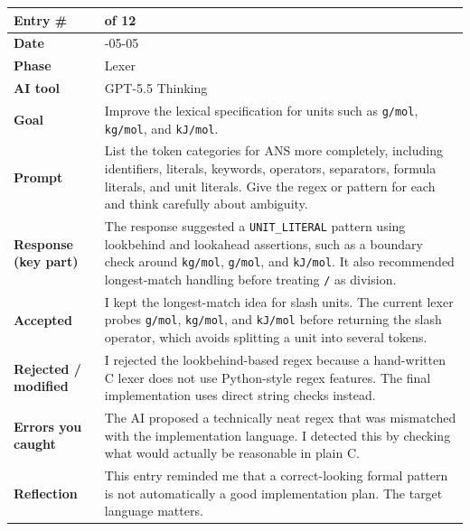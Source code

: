 \documentclass[11pt,a4paper]{article}
\newcommand{\code}[1]{\texttt{#1}}
\newcommand{\entrygap}{\vspace{8pt}}
\newenvironment{journalentry}{%
  \begin{center}\small\renewcommand{\arraystretch}{1.22}%
  \begin{tabular}{|>{\columncolor{anscodebg}\bfseries}p{3.0cm}|>{\RaggedRight\arraybackslash}p{12.25cm}|}%
  \hline
}{%
  \end{tabular}\end{center}\entrygap
}
\begin{document}
\begin{journalentry}
Entry \# & 4 of 12 \\ \hline
Date & 2026-05-05 \\ \hline
Phase & Lexer \\ \hline
AI tool & GPT-5.5 Thinking \\ \hline
Goal & Improve the lexical specification for units such as \code{g/mol}, \code{kg/mol}, and \code{kJ/mol}. \\ \hline
Prompt & List the token categories for ANS more completely, including identifiers, literals, keywords, operators, separators, formula literals, and unit literals. Give the regex or pattern for each and think carefully about ambiguity. \\ \hline
Response (key part) & The response suggested a \code{UNIT\_LITERAL} pattern using lookbehind and lookahead assertions, such as a boundary check around \code{kg/mol}, \code{g/mol}, and \code{kJ/mol}. It also recommended longest-match handling before treating \code{/} as division. \\ \hline
Accepted & I kept the longest-match idea for slash units. The current lexer probes \code{g/mol}, \code{kg/mol}, and \code{kJ/mol} before returning the slash operator, which avoids splitting a unit into several tokens. \\ \hline
Rejected / modified & I rejected the lookbehind-based regex because a hand-written C lexer does not use Python-style regex features. The final implementation uses direct string checks instead. \\ \hline
Errors you caught & The AI proposed a technically neat regex that was mismatched with the implementation language. I detected this by checking what would actually be reasonable in plain C. \\ \hline
Reflection & This entry reminded me that a correct-looking formal pattern is not automatically a good implementation plan. The target language matters. \\ \hline
\end{journalentry}
\end{document}
